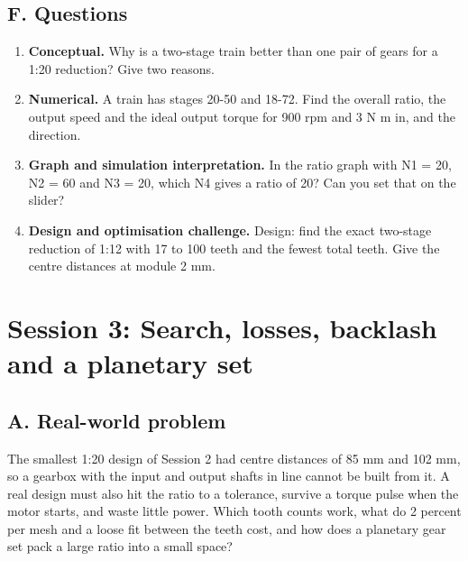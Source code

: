 \documentclass[11pt,a4paper]{article}
\begin{document}
\subsection*{F. Questions}
\begin{enumerate}[nosep]
\item \textbf{Conceptual.} Why is a two-stage train better than one pair of gears for a 1:20 reduction? Give two reasons.
\item \textbf{Numerical.} A train has stages 20-50 and 18-72. Find the overall ratio, the output speed and the ideal output torque for 900 rpm and 3 N m in, and the direction.
\item \textbf{Graph and simulation interpretation.} In the ratio graph with N1 = 20, N2 = 60 and N3 = 20, which N4 gives a ratio of 20? Can you set that on the slider?
\item \textbf{Design and optimisation challenge.} Design: find the exact two-stage reduction of 1:12 with 17 to 100 teeth and the fewest total teeth. Give the centre distances at module 2 mm.
\end{enumerate}

\section{Session 3: Search, losses, backlash and a planetary set}

\subsection*{A. Real-world problem}
The smallest 1:20 design of Session 2 had centre distances of 85 mm and 102 mm, so a gearbox with the input and output shafts in line cannot be built from it. A real design must also hit the ratio to a tolerance, survive a torque pulse when the motor starts, and waste little power. Which tooth counts work, what do 2 percent per mesh and a loose fit between the teeth cost, and how does a planetary gear set pack a large ratio into a small space?
\end{document}
